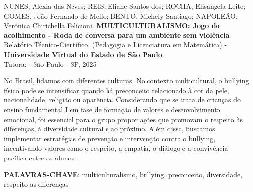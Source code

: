 
{\setlength{\parindent}{0pt}
NUNES, Aléxia das Neves; REIS, Eliane Santos dos; ROCHA, Elisangela Leite; GOMES, João Fernando de Mello; BENTO, Michely Santiago; NAPOLEÃO, Verônica Chirichella Felicioni. \textbf{MULTICULTURALISMO: Jogo do acolhimento - Roda de conversa para um ambiente sem violência } Relatório Técnico-Científico. (Pedagogia e Licenciatura em Matemática) - \textbf{Universidade Virtual do Estado de São Paulo}.\\

Tutora: \orientadora \;- São Paulo - SP, 2025

}



\setlength{\absparsep}{18pt} %


\begin{resumo}
	No Brasil, lidamos com diferentes culturas. No contexto multicultural, o bullying físico pode se intensificar quando há preconceito relacionado à cor da pele, nacionalidade, religião ou aparência. Considerando que se trata de crianças do ensino fundamental I em fase de formação de valores e desenvolvimento emocional, foi essencial para o grupo propor ações que promovam o respeito às diferenças, à diversidade cultural e ao próximo. Além disso, buscamos implementar estratégias de prevenção e intervenção contra o bullying, incentivando valores como o respeito, a empatia, o diálogo e a convivência pacífica entre os alunos. 

	\textbf{PALAVRAS-CHAVE}: multiculturalismo, bullying, preconceito, diversidade, respeito as diferenças
\end{resumo}


\listoffigures*
\clearpage


\tableofcontents*
\clearpage

